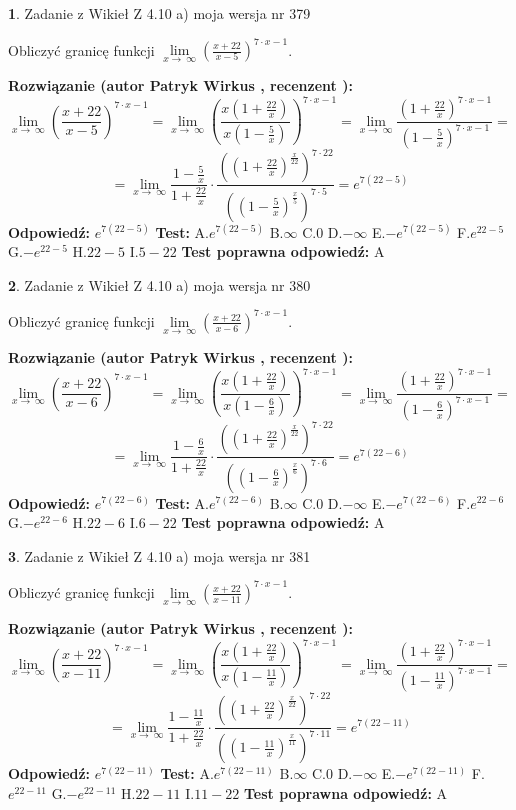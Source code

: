 \documentclass[12pt, a4paper]{article}
\theoremstyle{definition} %
\newtheorem{zad}{}
\newcommand{\zadStart}[1]{\begin{zad}#1\newline}
\newcommand{\zadStop}{\end{zad}}
\newcommand{\rozwStart}[2]{\noindent \textbf{Rozwiązanie (autor #1 , recenzent #2): }\newline}
\newcommand{\rozwStop}{\newline}
\newcommand{\odpStart}{\noindent \textbf{Odpowiedź:}\newline}
\newcommand{\odpStop}{\newline}
\newcommand{\testStart}{\noindent \textbf{Test:}\newline}
\newcommand{\testStop}{\newline}
\newcommand{\kluczStart}{\noindent \textbf{Test poprawna odpowiedź:}\newline}
\newcommand{\kluczStop}{\newline}
\begin{document}
\zadStart{Zadanie z Wikieł Z 4.10 a) moja wersja nr 379}


Obliczyć granicę funkcji  $\lim\limits_{x\to\ \infty}(\frac{x+22}{x-5})^{7\cdot x-1}$.
\zadStop
\rozwStart{Patryk Wirkus}{}
$$\lim\limits_{x\to\ \infty}(\frac{x+22}{x-5})^{7\cdot x-1} = \lim\limits_{x\to\ \infty}(\frac{x(1+\frac{22}{x})}{x(1-\frac{5}{x})})^{7\cdot x-1}=\lim\limits_{x\to\ \infty}\frac{(1+\frac{22}{x})^{7\cdot x-1}}{(1-\frac{5}{x})^{7\cdot x-1}}=$$
$$=\lim\limits_{x\to\ \infty}\frac{1-\frac{5}{x}}{1+\frac{22}{x}}\cdot\frac{((1+\frac{22}{x})^{\frac{x}{22}})^{7\cdot22}}{((1-\frac{5}{x})^{\frac{x}{5}})^{7\cdot5}}=e^{7(22-5)}$$
\rozwStop
\odpStart
$e^{7(22-5)}$
\odpStop
\testStart
A.$e^{7(22-5)}$ B.$\infty$ C.$0$ D.$-\infty$ E.$-e^{7(22-5)}$
F.$e^{22-5}$ G.$-e^{22-5}$
H.$22-5$
I.$5-22$
\testStop
\kluczStart
A
\kluczStop



\zadStart{Zadanie z Wikieł Z 4.10 a) moja wersja nr 380}


Obliczyć granicę funkcji  $\lim\limits_{x\to\ \infty}(\frac{x+22}{x-6})^{7\cdot x-1}$.
\zadStop
\rozwStart{Patryk Wirkus}{}
$$\lim\limits_{x\to\ \infty}(\frac{x+22}{x-6})^{7\cdot x-1} = \lim\limits_{x\to\ \infty}(\frac{x(1+\frac{22}{x})}{x(1-\frac{6}{x})})^{7\cdot x-1}=\lim\limits_{x\to\ \infty}\frac{(1+\frac{22}{x})^{7\cdot x-1}}{(1-\frac{6}{x})^{7\cdot x-1}}=$$
$$=\lim\limits_{x\to\ \infty}\frac{1-\frac{6}{x}}{1+\frac{22}{x}}\cdot\frac{((1+\frac{22}{x})^{\frac{x}{22}})^{7\cdot22}}{((1-\frac{6}{x})^{\frac{x}{6}})^{7\cdot6}}=e^{7(22-6)}$$
\rozwStop
\odpStart
$e^{7(22-6)}$
\odpStop
\testStart
A.$e^{7(22-6)}$ B.$\infty$ C.$0$ D.$-\infty$ E.$-e^{7(22-6)}$
F.$e^{22-6}$ G.$-e^{22-6}$
H.$22-6$
I.$6-22$
\testStop
\kluczStart
A
\kluczStop



\zadStart{Zadanie z Wikieł Z 4.10 a) moja wersja nr 381}


Obliczyć granicę funkcji  $\lim\limits_{x\to\ \infty}(\frac{x+22}{x-11})^{7\cdot x-1}$.
\zadStop
\rozwStart{Patryk Wirkus}{}
$$\lim\limits_{x\to\ \infty}(\frac{x+22}{x-11})^{7\cdot x-1} = \lim\limits_{x\to\ \infty}(\frac{x(1+\frac{22}{x})}{x(1-\frac{11}{x})})^{7\cdot x-1}=\lim\limits_{x\to\ \infty}\frac{(1+\frac{22}{x})^{7\cdot x-1}}{(1-\frac{11}{x})^{7\cdot x-1}}=$$
$$=\lim\limits_{x\to\ \infty}\frac{1-\frac{11}{x}}{1+\frac{22}{x}}\cdot\frac{((1+\frac{22}{x})^{\frac{x}{22}})^{7\cdot22}}{((1-\frac{11}{x})^{\frac{x}{11}})^{7\cdot11}}=e^{7(22-11)}$$
\rozwStop
\odpStart
$e^{7(22-11)}$
\odpStop
\testStart
A.$e^{7(22-11)}$ B.$\infty$ C.$0$ D.$-\infty$ E.$-e^{7(22-11)}$
F.$e^{22-11}$ G.$-e^{22-11}$
H.$22-11$
I.$11-22$
\testStop
\kluczStart
A
\kluczStop
\end{document}
